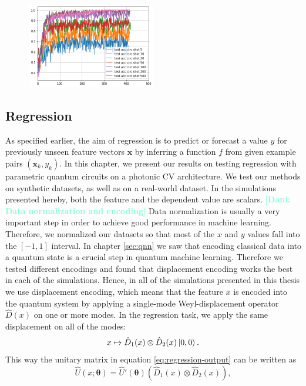 \documentclass[12pt, a4paper,  nobibnotes]{article}
\newcommand{\op}[1]{\hat{#1}}
\newcommand{\nd}[1]{\textcolor{Aquamarine}{\textbf{[Dani: #1]}}}
\begin{document}
\begin{figure}[H]
    \centering
    \includegraphics[width=0.5\textwidth]{figures/classifier-test-acc-shots.png}
    \caption{}
    \label{fig:single_layer_regression}
\end{figure}


\subsection{Regression}
\label{sec:regression-results}
As specified earlier, the aim of regression is to predict or forecast a value $y$ for 
previously unseen feature vectors $\mathbf x$ by inferring a function $f$ from 
given example pairs $(\mathbf x_k, y_k)$. 
In this chapter, we present our results on testing regression with parametric quantum 
circuits on a photonic CV architecture.
We test our methods on synthetic datasets, as well as on a real-world dataset.
In the simulations presented hereby, both the feature and the dependent
value are scalars. 
\nd{Data normalization and encoding}
Data normalization is usually 
a very important step in order to achieve good performance in machine learning.
Therefore, we normalized our datasets so
that most of the $x$ and $y$ values fall into the $[-1,1]$ interval.
In chapter \ref{sec:qnn} we saw that encoding classical data into a quantum state is a 
crucial step in quantum machine learning. Therefore we tested different encodings 
and found that displacement encoding works the best in each of the simulations.
Hence, in all of the simulations presented in this thesis we use displacement encoding, which means that 
the feature $x$ is encoded into the quantum system by applying a single-mode Weyl-displacement
operator $\op D(x)$ on one or more modes. In the regression task, we apply the same displacement
on all of the modes:
\begin{equation}
    x \mapsto \op D_1(x)\otimes\op D_2(x) \ket{0,0}.
\end{equation}
This way the unitary matrix in equation \ref{eq:regression-output} can be written as 
\begin{equation}
    \op U(x;\pmb\theta) = \op U'(\pmb\theta) \left(\op D_1(x)\otimes\op D_2(x)\right),
\end{equation}
\end{document}
